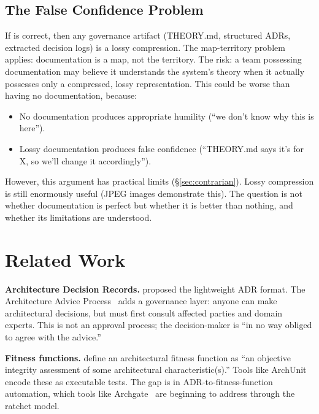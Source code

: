 \documentclass[11pt, a4paper, copyright]{googledeepmind}
\begin{document}
\subsection{The False Confidence Problem}

If \citet{naur1985} is correct, then any governance artifact (THEORY.md, structured ADRs, extracted decision logs) is a lossy compression. The map-territory problem applies: documentation is a map, not the territory. The risk: a team possessing documentation may believe it understands the system's theory when it actually possesses only a compressed, lossy representation. This could be worse than having no documentation, because:

\begin{itemize}
    \item No documentation produces appropriate humility (``we don't know why this is here'').
    \item Lossy documentation produces false confidence (``THEORY.md says it's for X, so we'll change it accordingly'').
\end{itemize}

However, this argument has practical limits (\S\ref{sec:contrarian}). Lossy compression is still enormously useful (JPEG images demonstrate this). The question is not whether documentation is perfect but whether it is better than nothing, and whether its limitations are understood.


\section{Related Work}
\label{sec:related}

\textbf{Architecture Decision Records.} \citet{nygard2011} proposed the lightweight ADR format. The Architecture Advice Process~\citep{harmellaw2023} adds a governance layer: anyone can make architectural decisions, but must first consult affected parties and domain experts. This is not an approval process; the decision-maker is ``in no way obliged to agree with the advice.''

\textbf{Fitness functions.} \citet{ford2017} define an architectural fitness function as ``an objective integrity assessment of some architectural characteristic(s).'' Tools like ArchUnit encode these as executable tests. The gap is in ADR-to-fitness-function automation, which tools like Archgate~\citep{archgate} are beginning to address through the ratchet model.
\end{document}
